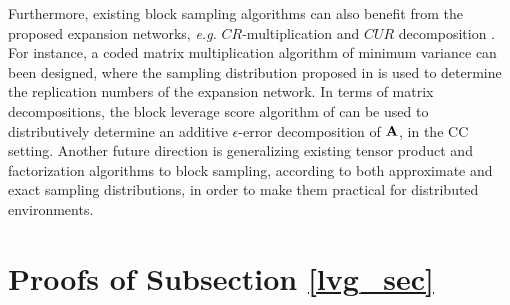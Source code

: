 \documentclass[journal,letterpaper,onecolumn,twoside,nofonttune]{IEEEtran}
\newcommand{\Ab}{\bold{A}}
\begin{document}
Furthermore, existing block sampling algorithms can also benefit from the proposed expansion networks, \textit{e.g.} $CR$-multiplication \cite{CPH20c} and $CUR$ decomposition \cite{OJXE18}. For instance, a coded matrix multiplication algorithm of minimum variance can been designed, where the sampling distribution proposed in \cite{CPH20c} is used to determine the replication numbers of the expansion network. In terms of matrix decompositions, the block leverage score algorithm of \cite{OJXE18} can be used to distributively determine an additive $\epsilon$-error decomposition of $\Ab$, in the CC setting. Another future direction is generalizing existing tensor product and factorization algorithms to block sampling, according to both approximate and exact sampling distributions, in order to make them practical for distributed environments.

\appendices

\section{Proofs of Subsection \ref{lvg_sec}}
\label{lvg_app}
\end{document}

